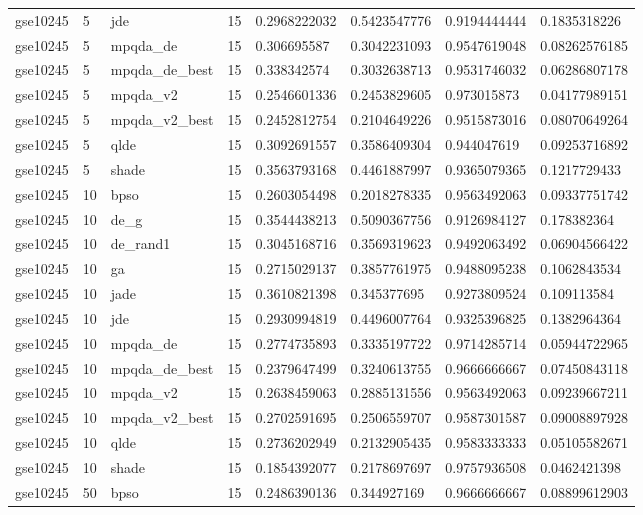 \begin{table}[t]
\begin{tabular}{llllllll}
gse10245 & 5 & jde & 15 & 0.2968222032 & 0.5423547776 & 0.9194444444 & 0.1835318226 \\
gse10245 & 5 & mpqda\_de & 15 & 0.306695587 & 0.3042231093 & 0.9547619048 & 0.08262576185 \\
gse10245 & 5 & mpqda\_de\_best & 15 & 0.338342574 & 0.3032638713 & 0.9531746032 & 0.06286807178 \\
gse10245 & 5 & mpqda\_v2 & 15 & 0.2546601336 & 0.2453829605 & 0.973015873 & 0.04177989151 \\
gse10245 & 5 & mpqda\_v2\_best & 15 & 0.2452812754 & 0.2104649226 & 0.9515873016 & 0.08070649264 \\
gse10245 & 5 & qlde & 15 & 0.3092691557 & 0.3586409304 & 0.944047619 & 0.09253716892 \\
gse10245 & 5 & shade & 15 & 0.3563793168 & 0.4461887997 & 0.9365079365 & 0.1217729433 \\
gse10245 & 10 & bpso & 15 & 0.2603054498 & 0.2018278335 & 0.9563492063 & 0.09337751742 \\
gse10245 & 10 & de\_g & 15 & 0.3544438213 & 0.5090367756 & 0.9126984127 & 0.178382364 \\
gse10245 & 10 & de\_rand1 & 15 & 0.3045168716 & 0.3569319623 & 0.9492063492 & 0.06904566422 \\
gse10245 & 10 & ga & 15 & 0.2715029137 & 0.3857761975 & 0.9488095238 & 0.1062843534 \\
gse10245 & 10 & jade & 15 & 0.3610821398 & 0.345377695 & 0.9273809524 & 0.109113584 \\
gse10245 & 10 & jde & 15 & 0.2930994819 & 0.4496007764 & 0.9325396825 & 0.1382964364 \\
gse10245 & 10 & mpqda\_de & 15 & 0.2774735893 & 0.3335197722 & 0.9714285714 & 0.05944722965 \\
gse10245 & 10 & mpqda\_de\_best & 15 & 0.2379647499 & 0.3240613755 & 0.9666666667 & 0.07450843118 \\
gse10245 & 10 & mpqda\_v2 & 15 & 0.2638459063 & 0.2885131556 & 0.9563492063 & 0.09239667211 \\
gse10245 & 10 & mpqda\_v2\_best & 15 & 0.2702591695 & 0.2506559707 & 0.9587301587 & 0.09008897928 \\
gse10245 & 10 & qlde & 15 & 0.2736202949 & 0.2132905435 & 0.9583333333 & 0.05105582671 \\
gse10245 & 10 & shade & 15 & 0.1854392077 & 0.2178697697 & 0.9757936508 & 0.0462421398 \\
gse10245 & 50 & bpso & 15 & 0.2486390136 & 0.344927169 & 0.9666666667 & 0.08899612903 \\

\end{tabular}
\end{table}
